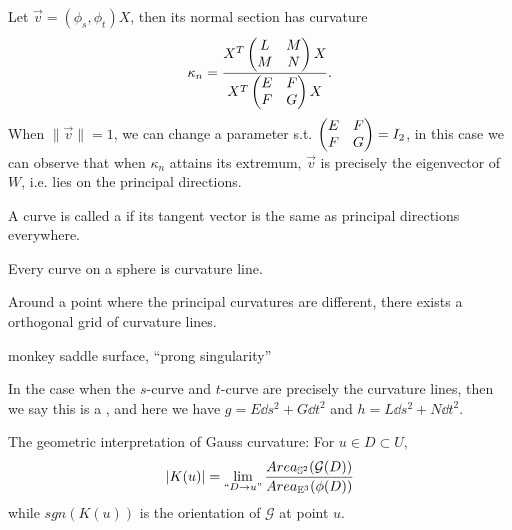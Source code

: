 Let $\vec{v}=(\phi_s,\phi_t)X$, then its normal section has curvature
\[
\kappa_n = \frac{X^T \begin{pmatrix} L&M\\M&N \end{pmatrix} X}{X^T \begin{pmatrix} E&F\\F&G \end{pmatrix} X}.
\]
When $ \lVert \vec{v} \rVert = 1$, we can change a parameter s.t.
$\begin{pmatrix} E&F\\F&G \end{pmatrix} = I_2$, in this case we can observe that
when $\kappa_n$ attains its extremum, $\vec{v}$ is precisely
the eigenvector of $W$, i.e. lies on the principal directions.

\begin{definition}
	A curve is called a  if its tangent vector
	is the same as principal directions everywhere.
\end{definition}
\begin{example}
    Every curve on a sphere is curvature line.

	Around a point where the principal curvatures are different,
	there exists a orthogonal grid of curvature lines.
\end{example}
\begin{example}
    monkey saddle surface, ``prong singularity''
\end{example}

In the case when the $s$-curve and  $t$-curve are precisely the
curvature lines, then we say this is a ,
and here we have $g = E\dd s^2 + G\dd t^2$ and $h = L\dd s^2 + N\dd t^2$.

\begin{remark}
    The geometric interpretation of Gauss curvature:
	For $u\in D \subset U$,
	\[
	|K(u)|=\lim_{``D\to u"}
	\frac{Area_{\mathbb{S}^2}(\mathcal{G}(D))}{Area_{\mathbb{E}^3}(\phi(D))}
	\]
	while $sgn(K(u))$ is the orientation of $\mathcal{G}$ at point $u$.
\end{remark}
